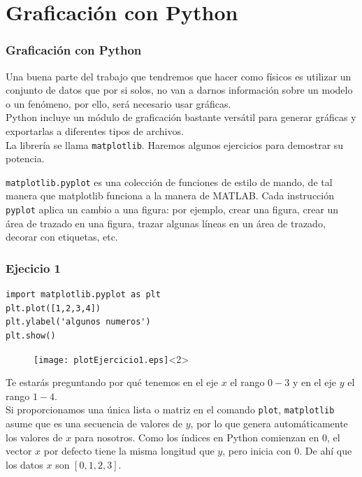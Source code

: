 \section{Graficaci\'{o}n con Python}
\begin{frame}
\frametitle{Graficaci\'{o}n con Python}
Una buena parte del trabajo que tendremos que hacer como f\'{i}sicos es utilizar un conjunto de datos que por si solos, no van a darnos informaci\'{o}n sobre un modelo o un fen\'{o}meno, por ello, ser\'{a} necesario usar gr\'{a}ficas.
\\
\medskip
Python incluye un m\'{o}dulo de graficaci\'{o}n bastante vers\'{a}til para generar gr\'{a}ficas y exportarlas a diferentes tipos de archivos.
\\
\medskip
La librer\'{i}a se llama \texttt{matplotlib}. Haremos algunos ejercicios para demostrar su potencia.
\end{frame}
\begin{frame}
\texttt{matplotlib.pyplot} es una colecci\'{o}n de funciones de estilo de mando, de tal manera que matplotlib funciona a la manera de MATLAB. Cada instrucci\'{o}n \texttt{pyplot} aplica un cambio a una figura: por ejemplo, crear una figura, crear un \'{a}rea de trazado en una figura, trazar algunas l\'{i}neas en un \'{a}rea de trazado, decorar con etiquetas, etc.
\end{frame}
\begin{frame}[fragile]
\frametitle{Ejecicio 1}
\begin{lstlisting}
import matplotlib.pyplot as plt
plt.plot([1,2,3,4])
plt.ylabel('algunos numeros')
plt.show()
\end{lstlisting}
\begin{figure}
	\centering
	\texttt{[image: plotEjercicio1.eps]}<2> 
\end{figure}
\end{frame}
\begin{frame}
Te estar\'{a}s preguntando por qu\'{e} tenemos en el eje $x$ el rango $0-3$ y en el eje $y$ el rango  $1-4$.
\\
\medskip
Si proporcionamos una \'{u}nica lista o matriz en el comando \texttt{plot}, \texttt{matplotlib} asume que es una secuencia de valores de $y$, por lo que genera autom\'{a}ticamente los valores de $x$ para nosotros. Como los \'{i}ndices en Python comienzan en $0$, el vector $x$ por defecto tiene la misma longitud que $y$, pero inicia con 0. De ah\'{i} que los datos $x$ son $[0,1,2,3]$.
\end{frame}
